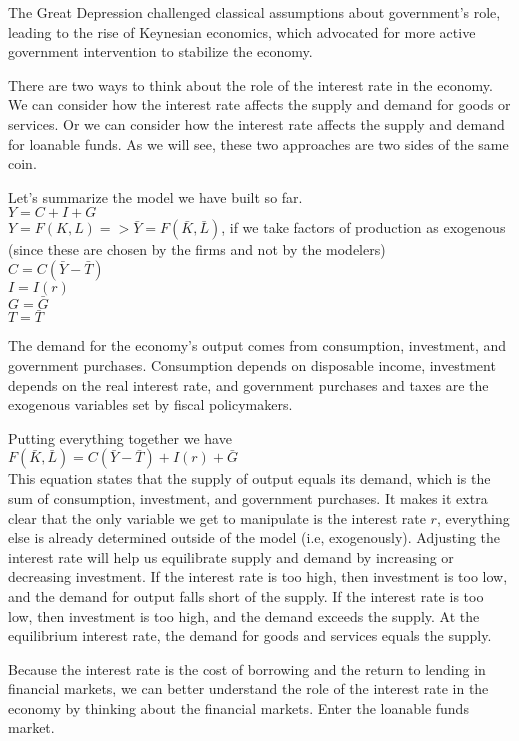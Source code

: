 \documentclass[10pt]{article}
\begin{document}
The Great Depression challenged classical assumptions about government's role, leading to the rise of Keynesian economics, which advocated for more active government intervention to stabilize the economy.

There are two ways to think about the role of the interest rate in the economy. We can consider how the interest rate affects the supply and demand for goods or services. Or we can consider how the interest rate affects the supply and demand for loanable funds. As we will see, these two approaches are two sides of the same coin.

Let's summarize the model we have built so far.\\
$Y=C+I+G$\\
$Y=F(K, L)=>\bar{Y}=F(\bar{K}, \bar{L})$, if we take factors of production as exogenous (since these are chosen by the firms and not by the modelers)\\
$C=C(\bar{Y}-\bar{T})$\\
$I=I(r)$\\
$G=\bar{G}$\\
$T=\bar{T}$

The demand for the economy's output comes from consumption, investment, and government purchases. Consumption depends on disposable income, investment depends on the real interest rate, and government purchases and taxes are the exogenous variables set by fiscal policymakers.

Putting everything together we have\\
$F(\bar{K}, \bar{L})=C(\bar{Y}-\bar{T})+I(r)+\bar{G}$\\
This equation states that the supply of output equals its demand, which is the sum of consumption, investment, and government purchases. It makes it extra clear that the only variable we get to manipulate is the interest rate $r$, everything else is already determined outside of the model (i.e, exogenously). Adjusting the interest rate will help us equilibrate supply and demand by increasing or decreasing investment. If the interest rate is too high, then investment is too low, and the demand for output falls short of the supply. If the interest rate is too low, then investment is too high, and the demand exceeds the supply. At the equilibrium interest rate, the demand for goods and services equals the supply.

Because the interest rate is the cost of borrowing and the return to lending in financial markets, we can better understand the role of the interest rate in the economy by thinking about the financial markets. Enter the loanable funds market.
\end{document}
